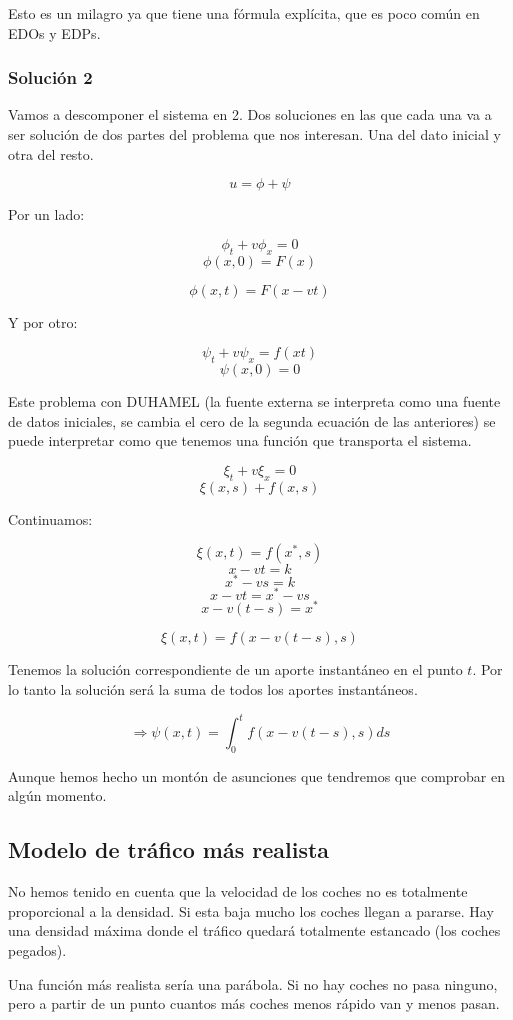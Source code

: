 \documentclass[palatino]{apuntes}
\begin{document}
Esto es un milagro ya que tiene una fórmula explícita, que es poco común en EDOs y EDPs.

\subsubsection{Solución 2}

Vamos a descomponer el sistema en 2. Dos soluciones en las que cada una va a ser solución de dos partes del problema que nos interesan. Una del dato inicial y otra del resto.

$$u = \phi + \psi$$

Por un lado:

$$\phi_t + v\phi_x = 0$$
$$\phi(x,0) = F(x) $$

$$\phi(x,t) = F(x-vt)$$

Y por otro:

$$\psi_t + v\psi_x = f(xt)$$
$$\psi(x,0) = 0$$

Este problema con DUHAMEL (la fuente externa se interpreta como una fuente de datos iniciales, se cambia el cero de la segunda ecuación de las anteriores) se puede interpretar como que tenemos una función que transporta el sistema.

$$\xi_t + v\xi_x = 0$$
$$\xi(x,s) + f(x,s)$$

Continuamos:

$$\xi(x,t) = f(x^*,s)$$
$$x-vt = k$$
$$x^* - vs = k$$
$$x-vt = x^* - vs$$
$$x-v(t-s) = x^{*}$$

$$\xi(x,t) = f(x - v(t-s), s)$$


Tenemos la solución correspondiente de un aporte instantáneo en el punto $t$. Por lo tanto la solución será la suma de todos los aportes instantáneos.

$$\Rightarrow \psi(x,t) = \int^{t}_{0} f(x-v(t-s),s) ds $$

Aunque hemos hecho un montón de asunciones que tendremos que comprobar en algún momento.

\subsection{Modelo de tráfico más realista}

No hemos tenido en cuenta que la velocidad de los coches no es totalmente proporcional a la densidad. Si esta baja mucho los coches llegan a pararse. Hay una densidad máxima donde el tráfico quedará totalmente estancado (los coches pegados).

Una función más realista sería una parábola. Si no hay coches no pasa ninguno, pero a partir de un punto cuantos más coches menos rápido van y menos pasan.
\end{document}
